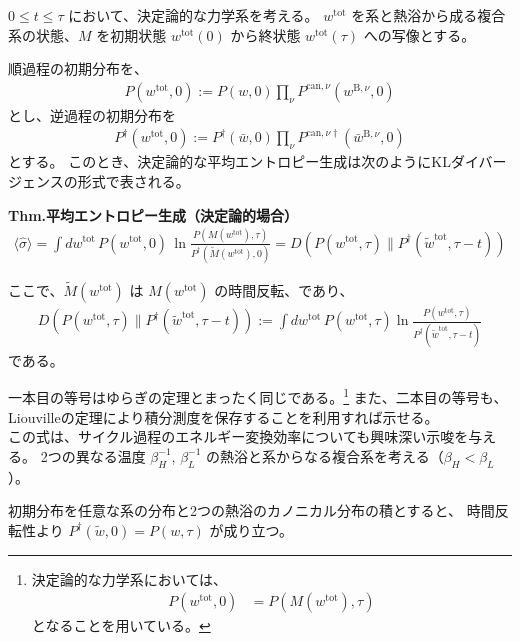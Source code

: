 \documentclass[a4paper,11pt]{jsarticle}
\numberwithin{equation}{section}
\begin{document}
$0 \leq t \leq \tau$ において、決定論的な力学系を考える。
$w^{\mathrm{tot}}$ を系と熱浴から成る複合系の状態、$M$ を初期状態 $w^{\mathrm{tot}}(0)$ から終状態 $w^{\mathrm{tot}}(\tau)$ への写像とする。

順過程の初期分布を、
\begin{align}
    P(w^{\mathrm{tot}}, 0) := P(w, 0) \prod_{\nu} P^{\mathrm{can}, \nu}(w^{\mathrm{B}, \nu}, 0)
\end{align}
とし、逆過程の初期分布を
\begin{align}
    P^{\dagger}(w^{\mathrm{tot}}, 0) := P^{\dagger}(\bar{w},0) \prod_{\nu} P^{\mathrm{can}, \nu\dagger}(\bar{w}^{\mathrm{B}, \nu}, 0)
\end{align}
とする。
このとき、決定論的な平均エントロピー生成は次のようにKLダイバージェンスの形式で表される。
\begin{itembox}[l]{\textbf{Thm.平均エントロピー生成（決定論的場合）}}
    \begin{align}
\langle \hat{\sigma} \rangle
= \int dw^{\mathrm{tot}}\, P(w^{\mathrm{tot}}, 0)\, \ln \frac{P(M(w^{\mathrm{tot}}), \tau)}{P^{\dagger}(\tilde{M}(w^{\mathrm{tot}}), 0)}
= D(P(w^{\mathrm{tot}}, \tau) \| P^{\dagger}(\tilde{w}^{\mathrm{tot}}, \tau - t))
\end{align}

ここで、$\tilde{M}(w^{\mathrm{tot}})$ は $M(w^{\mathrm{tot}})$ の時間反転、であり、
\begin{align}
D(P(w^{\mathrm{tot}}, \tau) \| P^{\dagger}(\tilde{w}^{\mathrm{tot}}, \tau - t))
:= \int dw^{\mathrm{tot}}\, P(w^{\mathrm{tot}}, \tau) \ln \frac{P(w^{\mathrm{tot}}, \tau)}{P^{\dagger}(\tilde{w}^{\mathrm{tot}}, \tau - t)}
\end{align}
である。
\end{itembox}
一本目の等号はゆらぎの定理とまったく同じである。\footnote{
    決定論的な力学系においては、
    \begin{align}
         P(w^{\mathrm{tot}}, 0) &= P(M(w^{\mathrm{tot}}), \tau) 
    \end{align}
    となることを用いている。

}
また、二本目の等号も、Liouvilleの定理により積分測度を保存することを利用すれば示せる。\\

この式は、サイクル過程のエネルギー変換効率についても興味深い示唆を与える。
2つの異なる温度 $\beta_H^{-1}$, $\beta_L^{-1}$ の熱浴と系からなる複合系を考える（$\beta_H < \beta_L$）。

初期分布を任意な系の分布と2つの熱浴のカノニカル分布の積とすると、
時間反転性より $P^{\dagger}(\tilde{w}, 0) = P(w, \tau)$ が成り立つ。
\end{document}

